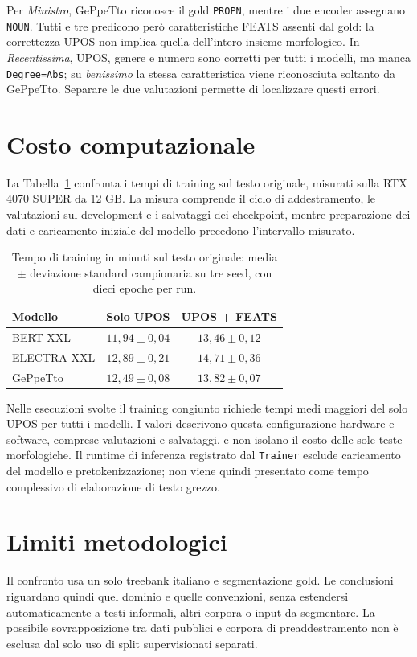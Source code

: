 \documentclass[12pt,a4paper]{report}
\begin{document}
Per \emph{Ministro}, GePpeTto riconosce il gold \texttt{PROPN}, mentre i due encoder assegnano \texttt{NOUN}. Tutti e tre predicono però caratteristiche FEATS assenti dal gold: la correttezza UPOS non implica quella dell'intero insieme morfologico. In \emph{Recentissima}, UPOS, genere e numero sono corretti per tutti i modelli, ma manca \texttt{Degree=Abs}; su \emph{benissimo} la stessa caratteristica viene riconosciuta soltanto da GePpeTto. Separare le due valutazioni permette di localizzare questi errori.

\FloatBarrier
\section{Costo computazionale}
\label{sec:computational-cost}
La Tabella~\ref{tab:training-time} confronta i tempi di training sul testo originale, misurati sulla RTX 4070 SUPER da 12 GB. La misura comprende il ciclo di addestramento, le valutazioni sul development e i salvataggi dei checkpoint, mentre preparazione dei dati e caricamento iniziale del modello precedono l'intervallo misurato.

\begin{table}[!htbp]
\centering\small
\begin{tabular}{lcc}
\toprule
Modello & Solo UPOS & UPOS + FEATS\\
\midrule
BERT XXL & $11{,}94\pm0{,}04$ & $13{,}46\pm0{,}12$\\
ELECTRA XXL & $12{,}89\pm0{,}21$ & $14{,}71\pm0{,}36$\\
GePpeTto & $12{,}49\pm0{,}08$ & $13{,}82\pm0{,}07$\\
\bottomrule
\end{tabular}
\caption{Tempo di training in minuti sul testo originale: media $\pm$ deviazione standard campionaria su tre seed, con dieci epoche per run.}
\label{tab:training-time}
\end{table}

Nelle esecuzioni svolte il training congiunto richiede tempi medi maggiori del solo UPOS per tutti i modelli. I valori descrivono questa configurazione hardware e software, comprese valutazioni e salvataggi, e non isolano il costo delle sole teste morfologiche. Il runtime di inferenza registrato dal \texttt{Trainer} esclude caricamento del modello e pretokenizzazione; non viene quindi presentato come tempo complessivo di elaborazione di testo grezzo.

\section{Limiti metodologici}
Il confronto usa un solo treebank italiano e segmentazione gold. Le conclusioni riguardano quindi quel dominio e quelle convenzioni, senza estendersi automaticamente a testi informali, altri corpora o input da segmentare. La possibile sovrapposizione tra dati pubblici e corpora di preaddestramento non è esclusa dal solo uso di split supervisionati separati.
\end{document}
